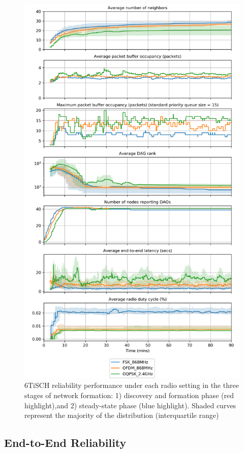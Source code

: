 \documentclass[journal]{IEEEtran}
\begin{document}
\begin{figure}
	\centering
	\includegraphics[width=0.90\columnwidth]{aggregate_plot_reliability}
	\caption{6TiSCH reliability performance under each radio setting in the three stages of network formation: 1) discovery and formation phase (red highlight),and 2) steady-state phase (blue highlight). Shaded curves represent the majority of the distribution (interquartile range)}
    \label{fig:aggregate_plot_reliability}
\end{figure}


\subsection{End-to-End Reliability}
\label{sec:reliability}
\end{document}
